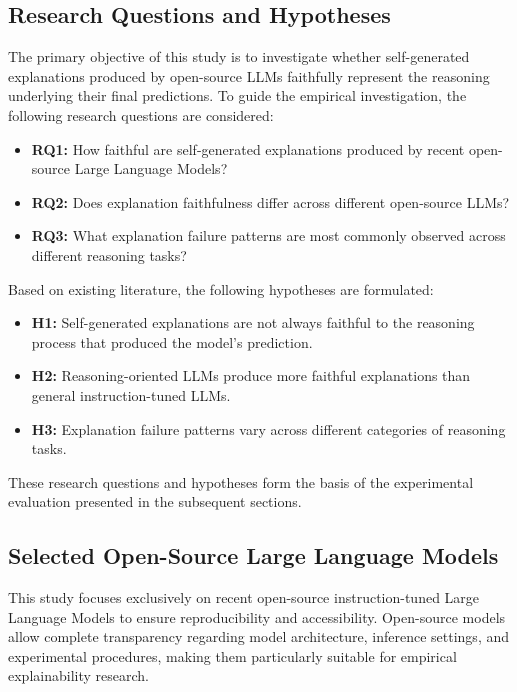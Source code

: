 \documentclass{article}
\begin{document}
\subsection{Research Questions and Hypotheses}

The primary objective of this study is to investigate whether self-generated explanations produced by open-source LLMs faithfully represent the reasoning underlying their final predictions. To guide the empirical investigation, the following research questions are considered:

\begin{itemize}
    \item \textbf{RQ1:} How faithful are self-generated explanations produced by recent open-source Large Language Models?
    
    \item \textbf{RQ2:} Does explanation faithfulness differ across different open-source LLMs?
    
    \item \textbf{RQ3:} What explanation failure patterns are most commonly observed across different reasoning tasks?
\end{itemize}

Based on existing literature, the following hypotheses are formulated:

\begin{itemize}
    \item \textbf{H1:} Self-generated explanations are not always faithful to the reasoning process that produced the model's prediction.
    
    \item \textbf{H2:} Reasoning-oriented LLMs produce more faithful explanations than general instruction-tuned LLMs.
    
    \item \textbf{H3:} Explanation failure patterns vary across different categories of reasoning tasks.
\end{itemize}

These research questions and hypotheses form the basis of the experimental evaluation presented in the subsequent sections.

\subsection{Selected Open-Source Large Language Models}

This study focuses exclusively on recent open-source instruction-tuned Large Language Models to ensure reproducibility and accessibility. Open-source models allow complete transparency regarding model architecture, inference settings, and experimental procedures, making them particularly suitable for empirical explainability research.
\end{document}
